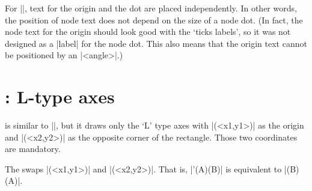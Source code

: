 \remark
For |\tzshoworigin*|, text for the origin and the dot are placed independently. In other words, the position of node text does not depend on the size of a node dot.
(In fact, the node text for the origin should look good with the `ticks labels', so it was not designed as a |label| for the node dot. This also means that the origin text cannot be positioned by an |<angle>|.)


\begin{tzcode}{.3}
\end{tzcode}



\section{\protect{}: L-type axes}
\label{s:tzaxesL}

\icmd{\tzaxesL} is similar to |\tzaxes|, but it draws only the `L' type axes with |(<x1,y1>)| as the origin and |(<x2,y2>)| as the opposite corner of the rectangle. 
Those two coordinates are mandatory.


The   swaps |(<x1,y1>)| and |(<x2,y2>)|.
That is, |\tzaxesL'(A)(B)| is equivalent to |\tzaxesL(B)(A)|.

\begin{tzcode}{.3}
\end{tzcode}

